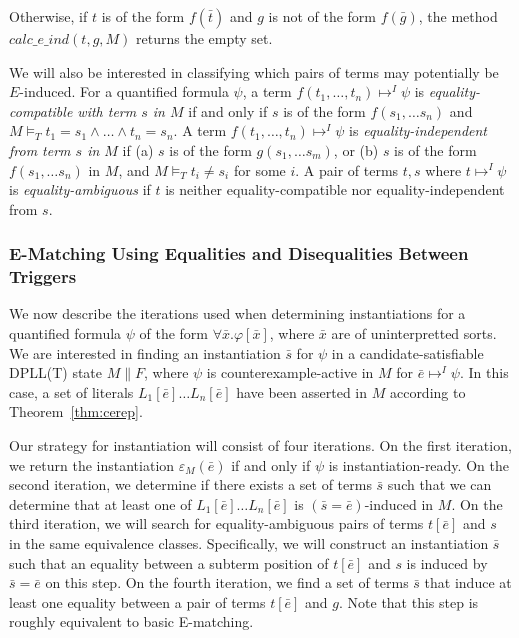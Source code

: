 \documentclass{llncs}
\begin{document}
Otherwise, if $t$ is of the form $f(\bar{t})$ and $g$ is not of the form $f( \bar{g})$, the method $calc\_e\_ind(t,g,M)$ returns the empty set.

We will also be interested in classifying which pairs of terms may potentially be $E$-induced.
For a quantified formula $\psi$, a term $f( t_1, \ldots, t_n ) \mapsto^I \psi$ is \emph{equality-compatible with term $s$ in $M$} if and only if $s$ is of the form $f( s_1, \ldots s_n )$ and $M \models_T t_1 = s_1 \wedge \ldots \wedge t_n = s_n$.
A term $f( t_1, \ldots, t_n ) \mapsto^I \psi$ is \emph{equality-independent from term $s$ in $M$} if (a) $s$ is of the form $g( s_1, \ldots s_m )$, or (b) $s$ is of the form $f( s_1, \ldots s_n )$ in $M$, and $M \models_T t_i \neq s_i$ for some $i$. 
A pair of terms $t, s$ where $t \mapsto^I \psi$ is \emph{equality-ambiguous} if $t$ is neither equality-compatible nor equality-independent from $s$.

\subsubsection{E-Matching Using Equalities and Disequalities Between Triggers}

We now describe the iterations used when determining instantiations for a quantified formula $\psi$ of the form $\forall \bar{x}. \varphi[\bar{x}]$, where $\bar{x}$ are of uninterpretted sorts.
We are interested in finding an instantiation $\bar{s}$ for $\psi$ in a candidate-satisfiable DPLL(T) state $M \parallel F$, where $\psi$ is counterexample-active in $M$ for $\bar{e} \mapsto^I \psi$.
In this case, a set of literals $L_1[\bar{e}] \ldots L_n[\bar{e}]$ have been asserted in $M$ according to Theorem~\ref{thm:cerep}.

Our strategy for instantiation will consist of four iterations.
On the first iteration, we return the instantiation $\varepsilon_M( \bar{e} )$ if and only if $\psi$ is instantiation-ready.
On the second iteration, we determine if there exists a set of terms $\bar{s}$ such that we can determine that at least one of $L_1[\bar{e}] \ldots L_n[\bar{e}]$ is $(\bar{s} = \bar{e})$-induced in $M$.
On the third iteration, we will search for equality-ambiguous pairs of terms $t[\bar{e}]$ and $s$ in the same equivalence classes.  
Specifically, we will construct an instantiation $\bar{s}$ such that an equality between a subterm position of $t[\bar{e}]$ and $s$ is induced by $\bar{s} = \bar{e}$ on this step.
On the fourth iteration, we find a set of terms $\bar{s}$ that induce at least one equality between a pair of terms $t[\bar{e}]$ and $g$.
Note that this step is roughly equivalent to basic E-matching.
\end{document}
